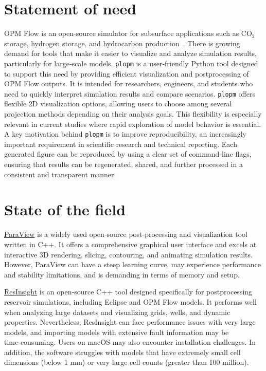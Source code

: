 \documentclass[11pt]{article}
\begin{document}
\section{Statement of need}
OPM Flow is an open-source simulator for subsurface applications such as CO$_2$ storage, hydrogen storage, and hydrocarbon production~\citep{Rassmussen:2021}. There is growing demand for tools that make it easier to visualize and analyze simulation results, particularly for large‑scale models. \texttt{plopm} is a user‑friendly Python tool designed to support this need by providing efficient visualization and postprocessing of OPM Flow outputs. It is intended for researchers, engineers, and students who need to quickly interpret simulation results and compare scenarios. \texttt{plopm} offers flexible 2D visualization options, allowing users to choose among several projection methods depending on their analysis goals. This flexibility is especially relevant in current studies where rapid exploration of model behavior is essential. A key motivation behind \texttt{plopm} is to improve reproducibility, an increasingly important requirement in scientific research and technical reporting. Each generated figure can be reproduced by using a clear set of command‑line flags, ensuring that results can be regenerated, shared, and further processed in a consistent and transparent manner.

\section{State of the field}
\href{https://www.paraview.org}{ParaView} is a widely used open‑source post‑processing and visualization tool written in C++. It offers a comprehensive graphical user interface and excels at interactive 3D rendering, slicing, contouring, and animating simulation results. However, ParaView can have a steep learning curve, may experience performance and stability limitations, and is demanding in terms of memory and setup.

\href{https://resinsight.org}{ResInsight} is an open‑source C++ tool designed specifically for postprocessing reservoir simulations, including Eclipse and OPM Flow models. It performs well when analyzing large datasets and visualizing grids, wells, and dynamic properties. Nevertheless, ResInsight can face performance issues with very large models, and importing models with extensive fault information may be time‑consuming. Users on macOS may also encounter installation challenges. In addition, the software struggles with models that have extremely small cell dimensions (below 1 mm) or very large cell counts (greater than 100 million).
\end{document}
